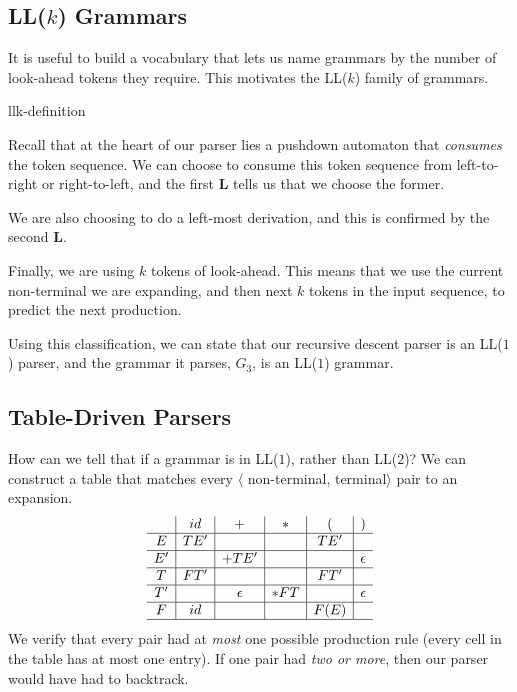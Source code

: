 \subsection{LL($k$) Grammars}\label{section:llk-grammar}
It is useful to build a vocabulary that lets us name grammars by the number of look-ahead tokens they require. This motivates the LL($k$) family of grammars. 



\begin{center}
    {llk-definition}
\end{center}

Recall that at the heart of our parser lies a pushdown automaton that \textit{consumes} the token sequence. We can choose to consume this token sequence from left-to-right or right-to-left, and the first \textbf{L} tells us that we choose the former.

We are also choosing to do a left-most derivation, and this is confirmed by the second \textbf{L}.

Finally, we are using $k$ tokens of look-ahead. This means that we use the current non-terminal we are expanding, and then next $k$ tokens in the input sequence, to predict the next production.

Using this classification, we can state that our recursive descent parser is an LL($1$) parser, and the grammar it parses, $G_3$, is an LL($1$) grammar.

\subsection{Table-Driven Parsers}\label{section:table-driven-parsers}
How can we tell that if a grammar is in LL($1$), rather than LL($2$)? We can construct a table that matches every $\langle$ non-terminal, terminal$\rangle$ pair to an expansion.
\[
\begin{array}{c|c|c|c|c|c}
   & id  & +        & *   & (     & )        \\\hline
E  & TE' &          &     & TE'   &          \\\hline
E' &     & +TE'     &     &       & \epsilon \\\hline
T  & FT' &          &     & FT'   &          \\\hline
T' &     & \epsilon & *FT &       & \epsilon \\\hline
F  & id  &          &     & F (E) &          \\\hline
\end{array}
\]
We verify that every pair had at \textit{most} one possible production rule (every cell in the table has at most one entry). If one pair had \textit{two or more}, then our parser would have had to backtrack.

